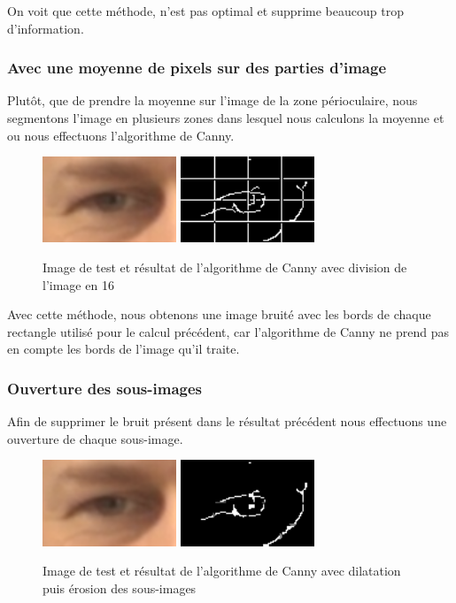 On voit que cette méthode, n'est pas optimal et supprime beaucoup trop d'information.

\subsubsection{Avec une moyenne de pixels sur des parties d'image}

Plutôt, que de prendre la moyenne sur l'image de la zone périoculaire, nous segmentons l'image
en plusieurs zones dans lesquel nous calculons la moyenne et ou nous effectuons l'algorithme
de Canny.

\begin{figure}[H]
 \center
 \includegraphics[width=4cm]{image/original.png}
 \includegraphics[width=4cm]{image/canny_decomposition.png}
 \caption{Image de test et résultat de l'algorithme de Canny avec division de l'image en 16}
\end{figure}

Avec cette méthode, nous obtenons une image bruité avec les bords de chaque rectangle utilisé
pour le calcul précédent, car l'algorithme de Canny ne prend pas en compte les bords de l'image
qu'il traite.

\subsubsection{Ouverture des sous-images}

Afin de supprimer le bruit présent dans le résultat précédent nous effectuons une ouverture
de chaque sous-image.

\begin{figure}[H]
 \center
 \includegraphics[width=4cm]{image/original.png}
 \includegraphics[width=4cm]{image/canny_final.png}
 \caption{Image de test et résultat de l'algorithme de Canny avec dilatation puis érosion des sous-images}
\end{figure}

